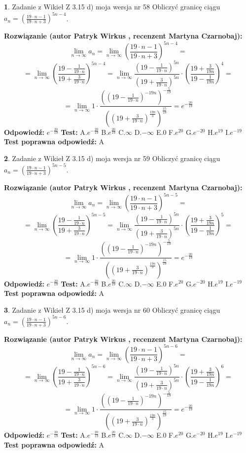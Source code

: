 \documentclass[12pt, a4paper]{article}
\theoremstyle{definition} %
\newtheorem{zad}{}
\newcommand{\zadStart}[1]{\begin{zad}#1\newline}
\newcommand{\zadStop}{\end{zad}}
\newcommand{\rozwStart}[2]{\noindent \textbf{Rozwiązanie (autor #1 , recenzent #2): }\newline}
\newcommand{\rozwStop}{\newline}
\newcommand{\odpStart}{\noindent \textbf{Odpowiedź:}\newline}
\newcommand{\odpStop}{\newline}
\newcommand{\testStart}{\noindent \textbf{Test:}\newline}
\newcommand{\testStop}{\newline}
\newcommand{\kluczStart}{\noindent \textbf{Test poprawna odpowiedź:}\newline}
\newcommand{\kluczStop}{\newline}
\begin{document}
\zadStart{Zadanie z Wikieł Z 3.15 d) moja wersja nr 58}
Obliczyć granicę ciągu $a_{n}=(\frac{19\cdot n - 1}{19 \cdot n + 3})^{5n-4}$.
\zadStop
\rozwStart{Patryk Wirkus}{Martyna Czarnobaj}
$$\lim\limits_{n\to\infty} a_{n} = \lim\limits_{n\to\infty}(\frac{19\cdot n - 1}{19 \cdot n + 3})^{5n-4}=$$
$$=\lim\limits_{n\to\infty}(\frac{19 - \frac{1}{19\cdot n}}{19 + \frac{3}{19 \cdot n}})^{5n-4}=\lim\limits_{n\to\infty}\frac{(19 - \frac{1}{19\cdot n})^{5n}}{(19 + \frac{3}{19\cdot n})^{5n}} \cdot (\frac{19+\frac{3}{19n}}{19-\frac{1}{19n}})^{4}=$$
$$=\lim\limits_{n\to\infty} 1 \cdot \frac{((19-\frac{1}{19 \cdot n})^{-19n})^{-\frac{5}{19}}}{((19+\frac{3}{19 \cdot n})^{\frac{19n}{3}})^{\frac{15}{19}}} =e^{-\frac{20}{19}}$$
\rozwStop
\odpStart
$e^{-\frac{20}{19}}$
\odpStop
\testStart
A.$ e^{-\frac{20}{19}}$
B.$ e^{\frac{20}{19}}$
C.$\infty$
D.$-\infty$
E.$0$
F.$e^{20}$
G.$e^{-20}$
H.$e^{19}$
I.$e^{-19}$
\testStop
\kluczStart
A
\kluczStop



\zadStart{Zadanie z Wikieł Z 3.15 d) moja wersja nr 59}
Obliczyć granicę ciągu $a_{n}=(\frac{19\cdot n - 1}{19 \cdot n + 3})^{5n-5}$.
\zadStop
\rozwStart{Patryk Wirkus}{Martyna Czarnobaj}
$$\lim\limits_{n\to\infty} a_{n} = \lim\limits_{n\to\infty}(\frac{19\cdot n - 1}{19 \cdot n + 3})^{5n-5}=$$
$$=\lim\limits_{n\to\infty}(\frac{19 - \frac{1}{19\cdot n}}{19 + \frac{3}{19 \cdot n}})^{5n-5}=\lim\limits_{n\to\infty}\frac{(19 - \frac{1}{19\cdot n})^{5n}}{(19 + \frac{3}{19\cdot n})^{5n}} \cdot (\frac{19+\frac{3}{19n}}{19-\frac{1}{19n}})^{5}=$$
$$=\lim\limits_{n\to\infty} 1 \cdot \frac{((19-\frac{1}{19 \cdot n})^{-19n})^{-\frac{5}{19}}}{((19+\frac{3}{19 \cdot n})^{\frac{19n}{3}})^{\frac{15}{19}}} =e^{-\frac{20}{19}}$$
\rozwStop
\odpStart
$e^{-\frac{20}{19}}$
\odpStop
\testStart
A.$ e^{-\frac{20}{19}}$
B.$ e^{\frac{20}{19}}$
C.$\infty$
D.$-\infty$
E.$0$
F.$e^{20}$
G.$e^{-20}$
H.$e^{19}$
I.$e^{-19}$
\testStop
\kluczStart
A
\kluczStop



\zadStart{Zadanie z Wikieł Z 3.15 d) moja wersja nr 60}
Obliczyć granicę ciągu $a_{n}=(\frac{19\cdot n - 1}{19 \cdot n + 3})^{5n-6}$.
\zadStop
\rozwStart{Patryk Wirkus}{Martyna Czarnobaj}
$$\lim\limits_{n\to\infty} a_{n} = \lim\limits_{n\to\infty}(\frac{19\cdot n - 1}{19 \cdot n + 3})^{5n-6}=$$
$$=\lim\limits_{n\to\infty}(\frac{19 - \frac{1}{19\cdot n}}{19 + \frac{3}{19 \cdot n}})^{5n-6}=\lim\limits_{n\to\infty}\frac{(19 - \frac{1}{19\cdot n})^{5n}}{(19 + \frac{3}{19\cdot n})^{5n}} \cdot (\frac{19+\frac{3}{19n}}{19-\frac{1}{19n}})^{6}=$$
$$=\lim\limits_{n\to\infty} 1 \cdot \frac{((19-\frac{1}{19 \cdot n})^{-19n})^{-\frac{5}{19}}}{((19+\frac{3}{19 \cdot n})^{\frac{19n}{3}})^{\frac{15}{19}}} =e^{-\frac{20}{19}}$$
\rozwStop
\odpStart
$e^{-\frac{20}{19}}$
\odpStop
\testStart
A.$ e^{-\frac{20}{19}}$
B.$ e^{\frac{20}{19}}$
C.$\infty$
D.$-\infty$
E.$0$
F.$e^{20}$
G.$e^{-20}$
H.$e^{19}$
I.$e^{-19}$
\testStop
\kluczStart
A
\kluczStop
\end{document}
